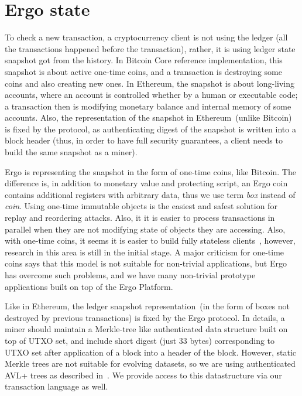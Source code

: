 \section{Ergo state}
\label{sec:utxo}


To check a new transaction, a cryptocurrency client is not using the ledger (all the transactions happened before the
transaction), rather, it is using ledger state snapshot got from the history. In Bitcoin Core reference implementation,
this snapshot is about active one-time coins, and a transaction is destroying some coins and also creating new ones.
In Ethereum, the snapshot is about long-living accounts, where an account is controlled whether by a human or
executable code; a transaction then is modifying monetary balance and internal memory of some accounts. Also, the
representation of the snapshot in Ethereum~(unlike Bitcoin) is fixed by the protocol, as authenticating digest of the
snapshot is written into a block header (thus, in order to have full security guarantees, a client needs to build
the same snapshot as a miner).

Ergo is representing the snapshot in the form of one-time coins, like Bitcoin. The difference is, in addition to monetary
value and protecting script, an Ergo coin contains additional registers with arbitrary data, thus we use term {\em box}
instead of {\em coin}. Using one-time immutable objects is the easiest and safest solution for replay and reordering
attacks. Also, it it is easier to process transactions in parallel when they are not modifying state of objects they
are accessing. Also, with one-time coins, it seems it is easier to build fully stateless clients~\cite{chepurnoy2018edrax},
however, research in this area is still in the initial stage. A major criticism for one-time coins says that this model
is not suitable for non-trivial applications, but Ergo has overcome such problems, and we have many non-trivial
prototype applications built on top of the Ergo Platform.

Like in Ethereum, the ledger snapshot representation~(in the form of boxes not destroyed by
previous transactions) is fixed by the Ergo protocol. In details, a miner should maintain a Merkle-tree like
authenticated data structure built on top of UTXO set, and include short digest (just 33 bytes) corresponding to UTXO
set after application of a block into a header of the block. However, static Merkle trees are not suitable for evolving
datasets, so we are using authenticated AVL+ trees as described in~\cite{reyzin2017improving}. We provide access to
this datastructure via our transaction language as well.
